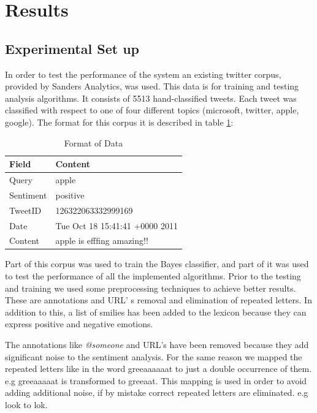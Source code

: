 
\section{Results}          
\subsection{Experimental Set up}    
In order to test the performance of the system an existing twitter corpus, provided by Sanders Analytics, was used. This data is for training and testing analysis algorithms. It consists of 5513 hand-classified tweets. Each tweet was classified with respect to one of four different topics (microsoft, twitter, apple, google). The format for this corpus it is described in table \ref{table:dataformat}:
\begin{table}[ht]
\centering
    \begin{tabular}{  l  l }
    \toprule
	Field & Content \\
	\midrule    
	 Query & apple	\\
	 Sentiment &	positive \\
	 TweetID & 126322063332999169 \\
	 Date	& Tue Oct 18 15:41:41 +0000 2011 \\
	 Content & apple is efffing amazing!! \\
	\bottomrule
      \end{tabular}
\caption{Format of Data}      
     \label{table:dataformat}
\end{table}

Part of this corpus was used to train the Bayes classifier, and part of it was used to test the performance of all the implemented algorithms. Prior to the testing and training we used some preprocessing techniques to achieve better results. These are annotations and URL' s removal and  elimination of repeated letters. In addition to this, a list of smilies has been added to the lexicon because they can express positive and negative emotions.

The annotations like \emph{@someone} and URL's have been removed because they add significant noise to the sentiment analysis. For the same reason we mapped the repeated letters like in the word greeaaaaaat to just a double occurrence of them. e.g greeaaaaat is transformed to greeaat. This mapping is used in order to avoid adding additional noise, if by mistake correct repeated letters are eliminated. e.g look to lok.

